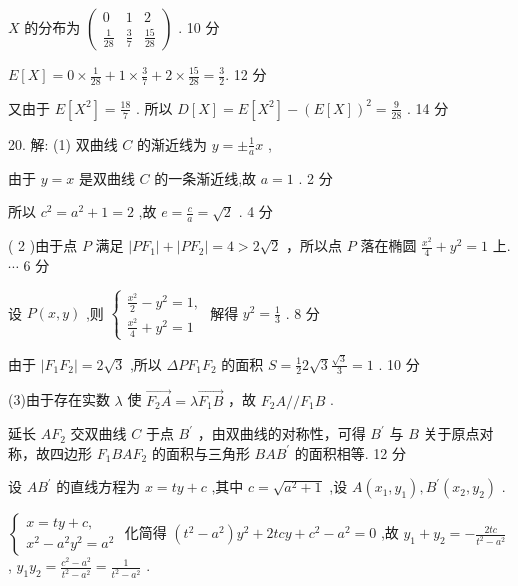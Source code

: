 \documentclass[10pt]{article}
\begin{document}
\(X\) 的分布为 \(\left( \begin{matrix} 0 & 1 & 2 \\  \frac{1}{28} & \frac{3}{7} & \frac{15}{28} \end{matrix}\right)\) . 10 分

\(E\left\lbrack  X\right\rbrack   = 0 \times  \frac{1}{28} + 1 \times  \frac{3}{7} + 2 \times  \frac{15}{28} = \frac{3}{2}.\) 12 分

又由于 \(E\left\lbrack  {X}^{2}\right\rbrack   = \frac{18}{7}\) . 所以 \(D\left\lbrack  X\right\rbrack   = E\left\lbrack  {X}^{2}\right\rbrack   - {\left( E\left\lbrack  X\right\rbrack  \right) }^{2} = \frac{9}{28}\) . 14 分

20. 解: (1) 双曲线 \(C\) 的渐近线为 \(y =  \pm  \frac{1}{a}x\) ,

由于 \(y = x\) 是双曲线 \(C\) 的一条渐近线,故 \(a = 1\) . 2 分

所以 \({c}^{2} = {a}^{2} + 1 = 2\) ,故 \(e = \frac{c}{a} = \sqrt{2}\) . 4 分

( 2 )由于点 \(P\) 满足 \(\left| {P{F}_{1}}\right|  + \left| {P{F}_{2}}\right|  = 4 > 2\sqrt{2}\) ，所以点 \(P\) 落在椭圆 \(\frac{{x}^{2}}{4} + {y}^{2} = 1\) 上. \(\cdots\) 6 分

设 \(P\left( {x,y}\right)\) ,则 \(\left\{  \begin{array}{l} \frac{{x}^{2}}{2} - {y}^{2} = 1, \\  \frac{{x}^{2}}{4} + {y}^{2} = 1 \end{array}\right.\) 解得 \({y}^{2} = \frac{1}{3}\) . 8 分

由于 \(\left| {{F}_{1}{F}_{2}}\right|  = 2\sqrt{3}\) ,所以 \({\Delta P}{F}_{1}{F}_{2}\) 的面积 \(S = \frac{1}{2}2\sqrt{3}\frac{\sqrt{3}}{3} = 1\) . 10 分

(3)由于存在实数 \(\lambda\) 使 \(\overrightarrow{{F}_{2}A} = \lambda \overrightarrow{{F}_{1}B}\) ，故 \({F}_{2}A//{F}_{1}B\) .

延长 \(A{F}_{2}\) 交双曲线 \(C\) 于点 \({B}^{\prime }\) ，由双曲线的对称性，可得 \({B}^{\prime }\) 与 \(B\) 关于原点对称，故四边形 \({F}_{1}{BA}{F}_{2}\) 的面积与三角形 \({BA}{B}^{\prime }\) 的面积相等. 12 分

设 \(A{B}^{\prime }\) 的直线方程为 \(x = {ty} + c\) ,其中 \(c = \sqrt{{a}^{2} + 1}\) ,设 \(A\left( {{x}_{1},{y}_{1}}\right) ,{B}^{\prime }\left( {{x}_{2},{y}_{2}}\right)\) .

\(\left\{  \begin{array}{l} x = {ty} + c, \\  {x}^{2} - {a}^{2}{y}^{2} = {a}^{2} \end{array}\right.\) 化简得 \(\left( {{t}^{2} - {a}^{2}}\right) {y}^{2} + {2tcy} + {c}^{2} - {a}^{2} = 0\) ,故 \({y}_{1} + {y}_{2} =  - \frac{2tc}{{t}^{2} - {a}^{2}}\) , \({y}_{1}{y}_{2} = \frac{{c}^{2} - {a}^{2}}{{t}^{2} - {a}^{2}} = \frac{1}{{t}^{2} - {a}^{2}}\) .
\end{document}
